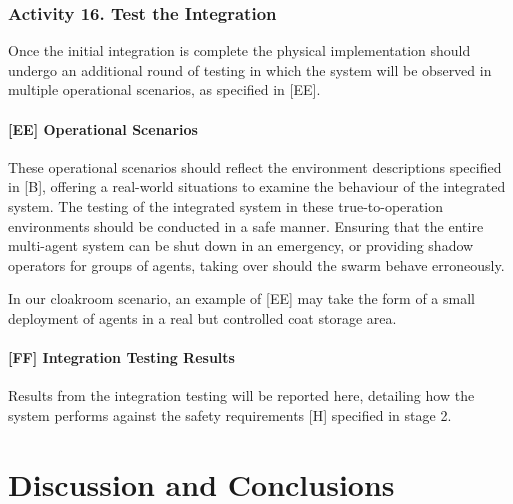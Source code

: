 \documentclass[lettersize,journal]{IEEEtran}
\begin{document}
\subsubsection*{Activity 16. Test the Integration}

Once the initial integration is complete the physical implementation should undergo an additional round of testing in which the system will be observed in multiple operational scenarios, as specified in [EE].

\paragraph*{[EE] Operational Scenarios}

These operational scenarios should reflect the environment descriptions specified in [B], offering a real-world situations to examine the behaviour of the integrated system. The testing of the integrated system in these true-to-operation environments should be conducted in a safe manner. Ensuring that the entire multi-agent system can be shut down in an emergency, or providing shadow operators for groups of agents, taking over should the swarm behave erroneously.

In our cloakroom scenario, an example of [EE] may take the form of a small deployment of agents in a real but controlled coat storage area.




\paragraph*{[FF] Integration Testing Results}

Results from the integration testing will be reported here, detailing how the system performs against the safety requirements [H] specified in stage 2.

	
\section{Discussion and Conclusions} \label{discussion-conclusions}
\end{document}
